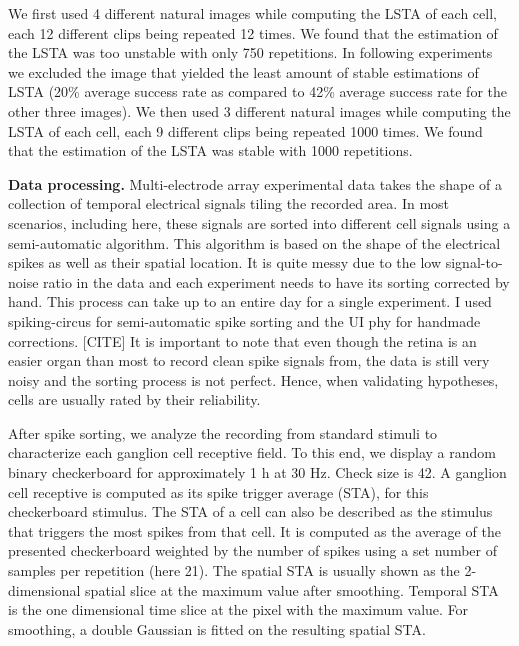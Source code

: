 We first used 4 different natural images while computing the LSTA of each cell,
each 12 different clips being repeated 12 times. We found that the estimation
of the LSTA was too unstable with only 750 repetitions. In following
experiments we excluded the image that yielded the least amount of stable
estimations of LSTA (20\% average success rate as compared to 42\% average
success rate for the other three images). We then used 3 different natural
images while computing the LSTA of each cell, each 9 different clips being
repeated 1000 times. We found that the estimation of the LSTA was stable with
1000 repetitions.

\textbf{Data processing.}
Multi-electrode array experimental data takes the shape of a collection of
temporal electrical signals tiling the recorded area.
In most scenarios, including here, these signals are sorted into different cell
signals using a semi-automatic algorithm. This algorithm is based on the shape
of the electrical spikes as well as their spatial location. It is
quite messy due to the low signal-to-noise ratio in the data and each
experiment
needs to have its sorting corrected by hand. This process can take up to an
entire day for a single experiment. I used spiking-circus for semi-automatic
spike sorting and the UI phy for handmade corrections. [CITE]
It is important to note that even though the retina is an easier organ than
most to record clean spike signals from, the data is still very noisy and the
sorting process is not perfect. Hence, when validating hypotheses, cells are
usually rated by their reliability.

After spike sorting, we analyze the recording from standard stimuli to
characterize each
ganglion cell receptive field. To this end, we display a random binary
checkerboard for approximately 1 h at 30 Hz. Check size is 42\microns. A
ganglion cell receptive is computed as its spike trigger average (STA), for
this checkerboard stimulus. The STA of a cell can also be described as the
stimulus that triggers the most spikes from that cell. It is computed as the
average of the presented checkerboard weighted by the number of spikes using a
set number of samples per repetition (here 21). The spatial STA is usually
shown as the 2-dimensional spatial slice at the maximum value after smoothing.
Temporal STA is the one dimensional time slice at the pixel with the maximum
value. For smoothing, a double Gaussian is fitted on the resulting spatial
STA.


